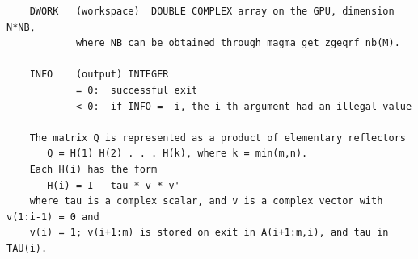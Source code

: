 \documentclass[10pt]{book}
\begin{document}
\begin{verbatim}
    DWORK   (workspace)  DOUBLE COMPLEX array on the GPU, dimension N*NB,
            where NB can be obtained through magma_get_zgeqrf_nb(M).

    INFO    (output) INTEGER   
            = 0:  successful exit   
            < 0:  if INFO = -i, the i-th argument had an illegal value   
 
    The matrix Q is represented as a product of elementary reflectors   
       Q = H(1) H(2) . . . H(k), where k = min(m,n).   
    Each H(i) has the form   
       H(i) = I - tau * v * v'   
    where tau is a complex scalar, and v is a complex vector with v(1:i-1) = 0 and 
    v(i) = 1; v(i+1:m) is stored on exit in A(i+1:m,i), and tau in TAU(i).   
\end{verbatim}

\newpage
\end{document}
